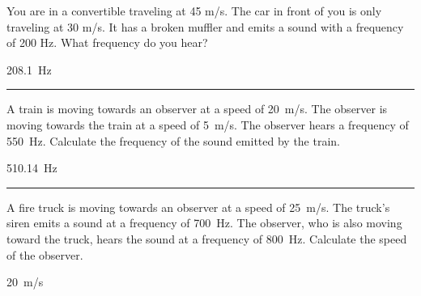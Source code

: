 \documentclass[12pt]{exam}
\begin{document}
\Large

\def\mystrut{\protect\rule[-2.2ex]{0ex}{2.2ex}} 
\qformat{ \textbf{Task \#\thequestion}
  \mystrut  \hfill}


\begin{questions}


\question
  You are in a convertible traveling at 45 m/s.  The car in front of you is only traveling at 30 m/s.  It has a broken muffler and emits a sound with a frequency of 200 Hz.  What frequency do you hear?
  \begin{solution}
    208.1~Hz
  \end{solution}

\vs \hrule \vs

\question
  A train is moving towards an observer at a speed of 20~m/s. The observer is moving towards the train at a speed of 5~m/s. The observer hears a frequency of 550~Hz.  Calculate the frequency of the sound emitted by the train.

   \begin{solution}
    510.14~Hz
  \end{solution}


\vs \hrule \vs


\question
A fire truck is moving towards an observer at a speed of 25~m/s. The truck's siren emits a sound at a frequency of 700~Hz. The observer, who is also moving toward the truck, hears the sound at a frequency of 800~Hz. Calculate the speed of the observer.

   \begin{solution}
    20~m/s
  \end{solution}





\end{questions}
\end{document}
